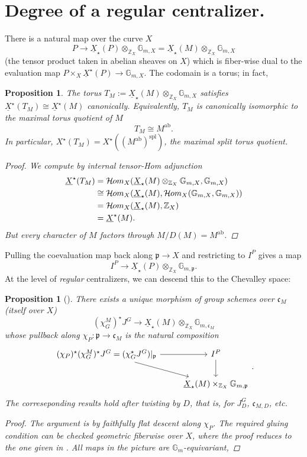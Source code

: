 \documentclass[openany]{amsbook}
\newtheorem{proposition}[theorem]{Proposition}
\theoremstyle{definition}
\theoremstyle{remark}
\numberwithin{equation}{section}
\newcommand{\Z}{\mathbb{Z}}
\newcommand{\G}{\mathbb{G}}
\newcommand{\ul}[1]{\underline{#1}}
\renewcommand{\-}{\operatorname{-}}
\newcommand{\sHom}{\mathcal{H}\kern -.5pt om}
\newcommand{\fc}{\mathfrak{c}}
\newcommand{\fp}{\mathfrak{p}}
\newcommand{\spl}{\mathrm{spl}}
\newcommand{\ab}{\mathrm{ab}}
\begin{document}
\section{Degree of a regular centralizer.}

There is a natural map over the curve $X$
$$
    P \to \ul{X}_\star(P) \otimes_{\Z_X} \G_{m, X} = \ul{X}_\star(M) \otimes_{\Z_X} \G_{m,X}
$$
(the tensor product taken in abelian sheaves on $X$) which is fiber-wise dual to the evaluation map $P \times_X \ul{X}^\star(P) \to \G_{m,X}$. The codomain is a torus; in fact,
\begin{proposition}
    The torus $T_M := \ul{X}_\star(M) \otimes_{\Z_X} \G_{m,X}$ satisfies $\ul{X}^\star(T_M) \cong \ul{X}^\star(M)$ canonically. Equivalently, $T_M$ is canonically isomorphic to the maximal torus quotient of $M$
    $$
        T_M \cong M^{\ab}.
    $$
    In particular, $X^\star(T_M) = X^\star((M^{\ab})^\spl)$, the maximal split torus quotient.
    \begin{proof}
        We compute by internal tensor-Hom adjunction
        \begin{align*}
            \ul{X}^\star(T_M) &= \sHom_{X}(\ul{X}_\star(M) \otimes_{\Z_X} \G_{m,X}, \G_{m,X}) \\
            &\cong \sHom_X(\ul{X}_\star(M), \sHom_{X}(\G_{m,X}, \G_{m,X})) \\
            &= \sHom_X(\ul{X}_\star(M), \Z_X) \\
            &= \ul{X}^\star(M). 
        \end{align*}
    But every character of $M$ factors through $M/D(M) = M^{\ab}$.
    \end{proof}
\end{proposition}

Pulling the coevaluation map back along $\fp \to X$ and restricting to $I^P$ gives a map 
$$
    I^P \to \ul{X}_\star(P) \otimes_{\Z_X} \G_{m, \fp}.
$$
At the level of \emph{regular} centralizers, we can descend this to the Chevalley space:

\begin{proposition}[{{\cite[Proposition 3.3.1]{CLII}}}]\label{prop.deg.map.J}
    There exists a unique morphism of group schemes over $\fc_M$ (itself over $X$)
    \[
        (\chi^M_G)^\star J^G \to \ul{X}_\star(M) \otimes_{\Z_X} \G_{m, \fc_M}
    \]
    whose pullback along $\chi_P : \fp \to \fc_M$ is the natural composition
    \[
        \begin{tikzcd}[ampersand replacement=\&]
            (\chi_P)^\star (\chi_G^M)^\star J^G = (\chi_G^\star J^G)|_{\fp} \ar[r] \ar[dr] \& I^P \ar[d] \\
            \& \ul{X}_\star(M) \times_{\Z_X} \G_{m, \fp}
        \end{tikzcd}.
    \]
    The correseponding results hold after twisting by $D$, that is, for $J^G_D$, $\fc_{M,D}$, etc.
    \begin{proof}
        The argument is by faithfully flat descent along $\chi_P$. The required gluing condition can be checked geometric fiberwise over $X$, where the proof reduces to the one given in \cite{CLII}. All maps in the picture are $\G_m$-equivariant, 
    \end{proof}
\end{proposition}
\end{document}
